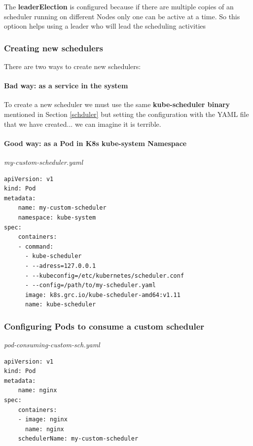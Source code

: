 \documentclass{article}
\newenvironment{codetemplate}[1][]{%
  \mybasecolorbox[#1]
  \itshape
}{%
  \endmybasecolorbox
}
\begin{document}
The \textbf{leaderElection} is configured because if there are multiple copies of an scheduler running on different Nodes only one can be active at a time. So this optioon helps using a leader who will lead the scheduling activities

\subsubsection{Creating new schedulers}

There are two ways to create new schedulers:

\paragraph{Bad way: as a service in the system}

To create a new scheduler we must use the same \textbf{kube-scheduler binary} mentioned in Section \ref{schduler} but setting the configuration with the YAML file that we have created... we can imagine it is terrible.

\paragraph{Good way: as a Pod in K8s kube-system Namespace}

\begin{codetemplate}{my-custom-scheduler.yaml}
\begin{verbatim}
apiVersion: v1
kind: Pod
metadata:
    name: my-custom-scheduler
    namespace: kube-system
spec:
    containers:
    - command:
      - kube-scheduler
      - --adress=127.0.0.1
      - --kubeconfig=/etc/kubernetes/scheduler.conf
      - --config=/path/to/my-scheduler.yaml
      image: k8s.grc.io/kube-scheduler-amd64:v1.11
      name: kube-scheduler
\end{verbatim}
\end{codetemplate}

\subsubsection{Configuring Pods to consume a custom scheduler}

\begin{codetemplate}{pod-consuming-custom-sch.yaml}
\begin{verbatim}
apiVersion: v1
kind: Pod
metadata:
    name: nginx
spec:
    containers:
    - image: nginx
      name: nginx
    schedulerName: my-custom-scheduler
\end{verbatim}
\end{codetemplate}
\end{document}
